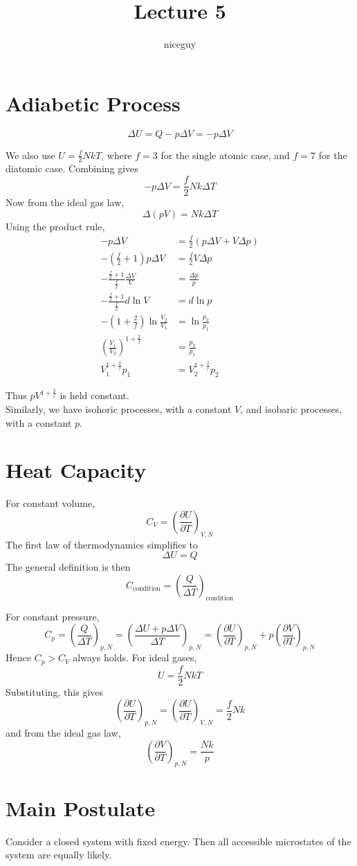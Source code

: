 \documentclass[12pt]{article}
\author{niceguy}
\title{Lecture 5}
\begin{document}
\maketitle

\section{Adiabetic Process}

$$\Delta U = Q - p\Delta V = -p\Delta V$$

We also use $U = \frac{f}{2}NkT$, where $f=3$ for the single atomic case, and $f=7$ for the diatomic case. Combining gives
$$-p\Delta V = \frac{f}{2}Nk\Delta T$$
Now from the ideal gas law,
$$\Delta(pV) = Nk\Delta T$$
Using the product rule,
\begin{align*}
	-p\Delta V &= \frac{f}{2}(p\Delta V + V\Delta p) \\
	-\left(\frac{f}{2}+1\right)p\Delta V &= \frac{f}{2}V\Delta p \\
	-\frac{\frac{f}{2}+1}{\frac{f}{2}} \frac{\Delta V}{V} &= \frac{\Delta p}{p} \\
	-\frac{\frac{f}{2}+1}{\frac{f}{2}} d\ln V &= d\ln p \\
	-\left(1+\frac{2}{f}\right)\ln\frac{V_2}{V_1} &= \ln\frac{p_2}{p_1} \\
	\left(\frac{V_1}{V_2}\right)^{1+\frac{2}{f}} &= \frac{p_2}{p_1} \\
	V_1^{1+\frac{2}{f}}p_1 &= V_2^{1+\frac{2}{f}}p_2
\end{align*}

Thus $pV^{1+\frac{2}{f}}$ is held constant. \\
Similarly, we have isohoric processes, with a constant $V$, and isobaric processes, with a constant $p$.

\section{Heat Capacity}

For constant volume,
$$C_V = \left(\frac{\partial U}{\partial T}\right)_{V,N}$$
The first law of thermodynamics simplifies to
$$\Delta U = Q$$
The general definition is then
$$C_{\text{condition}} = \left(\frac{Q}{\Delta T}\right)_{\text{condition}}$$

For constant pressure,
$$C_p = \left(\frac{Q}{\Delta T}\right)_{p,N} = \left(\frac{\Delta U + p\Delta V}{\Delta T}\right)_{p,N} = \left(\frac{\partial U}{\partial T}\right)_{p,N} + p\left(\frac{\partial V}{\partial T}\right)_{p,N}$$
Hence $C_p > C_V$ always holds. For ideal gases,
$$U = \frac{f}{2}NkT$$
Substituting, this gives
$$\left(\frac{\partial U}{\partial T}\right)_{p,N} = \left(\frac{\partial U}{\partial T}\right)_{V,N} = \frac{f}{2}Nk$$
and from the ideal gas law,
$$\left(\frac{\partial V}{\partial T}\right)_{p,N} = \frac{Nk}{p}$$

\section{Main Postulate}
Consider a closed system with fixed energy. Then all accessible microstates of the system are equally likely.
\end{document}
